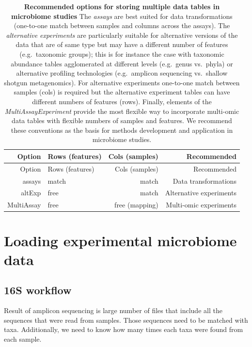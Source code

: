 \documentclass[
]{book}
\begin{document}
\begin{longtable}[]{@{}rlrr@{}}
\caption{\label{tab:options} \textbf{Recommended options for storing multiple data tables in microbiome studies} The \emph{assays} are best suited for data transformations (one-to-one match between samples and columns across the assays). The \emph{alternative experiments} are particularly suitable for alternative versions of the data that are of same type but may have a different number of features (e.g.~taxonomic groups); this is for instance the case with taxonomic abundance tables agglomerated at different levels (e.g.~genus vs.~phyla) or alternative profiling technologies (e.g.~amplicon sequencing vs.~shallow shotgun metagenomics). For alternative experiments one-to-one match between samples (cols) is required but the alternative experiment tables can have different numbers of features (rows). Finally, elements of the \emph{MultiAssayExperiment} provide the most flexible way to incorporate multi-omic data tables with flexible numbers of samples and features. We recommend these conventions as the basis for methods development and application in microbiome studies.}\tabularnewline
\toprule
Option & Rows (features) & Cols (samples) & Recommended \\
\midrule
\endfirsthead
\toprule
Option & Rows (features) & Cols (samples) & Recommended \\
\midrule
\endhead
assays & match & match & Data transformations \\
altExp & free & match & Alternative experiments \\
MultiAssay & free & free (mapping) & Multi-omic experiments \\
\bottomrule
\end{longtable}

\hypertarget{loading-experimental-microbiome-data}{%
\section{Loading experimental microbiome data}\label{loading-experimental-microbiome-data}}

\hypertarget{s-workflow}{%
\subsection{16S workflow}\label{s-workflow}}

Result of amplicon sequencing is large number of files that include all the sequences
that were read from samples. Those sequences need to be matched with taxa. Additionally,
we need to know how many times each taxa were found from each sample.
\end{document}
